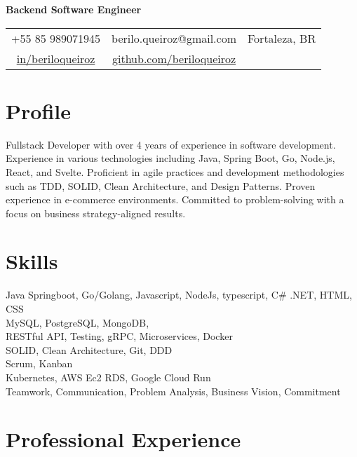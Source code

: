 \documentclass[11pt,a4paper,sans]{moderncv}
\begin{document}
\makecvtitle
\vspace*{-16mm}
\begin{center}\textbf{Backend Software Engineer}\end{center}
\begin{center}
	\begin{tabular}{ c c c }
		\faMobile\enspace +55 85 989071945                                                                  & \enspace berilo.queiroz@gmail.com & \enspace\faHome\enspace Fortaleza, BR \\
		\faLinkedin\enspace \color{blue} \href{https://www.linkedin.com/in/beriloqueiroz}{in/beriloqueiroz} &
		\faGithub\enspace \color{blue} \href{https://github.com/beriloqueiroz}{github.com/beriloqueiroz}    & \enspace
	\end{tabular}
\end{center}

\section{Profile}
 {
  Fullstack Developer with over 4 years of experience in software development. Experience in various technologies including Java, Spring Boot, Go, Node.js, React, and Svelte. Proficient in agile practices and development methodologies such as TDD, SOLID, Clean Architecture, and Design Patterns. Proven experience in e-commerce environments. Committed to problem-solving with a focus on business strategy-aligned results.
 }

\section{Skills}
 {
  Java Springboot, Go/Golang, Javascript, NodeJs, typescript, C\# .NET, HTML, CSS \\
  MySQL, PostgreSQL, MongoDB, \\
  RESTful API, Testing, gRPC, Microservices, Docker\\
  SOLID, Clean Architecture, Git, DDD \\
  Scrum, Kanban\\
  Kubernetes, AWS Ec2 RDS, Google Cloud Run\\
  Teamwork, Communication, Problem Analysis, Business Vision, Commitment\\
 }

\section{Professional Experience}
\end{document}
